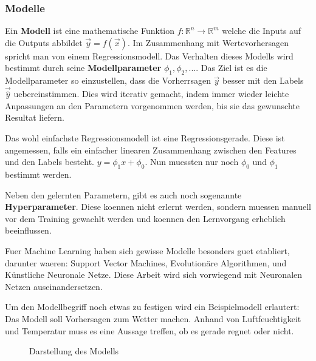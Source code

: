 \documentclass[../main]{subfiles}
\begin{document}
\subsubsection{Modelle}
Ein \textbf{Modell} ist eine mathematische Funktion $\mathit{f}\colon \mathbb{R}^n \to \mathbb{R}^m$ welche die Inputs auf die Outputs abbildet $\vec{y}=\mathit{f}(\vec{x})$.
Im Zusammenhang mit Wertevorhersagen spricht man von einem Regressionsmodell.
Das Verhalten dieses Modells wird bestimmt durch seine \textbf{Modellparameter} $\phi_1, \phi_2, ...$.
Das Ziel ist es die Modellparameter so einzustellen, dass die Vorherrsagen $\vec{y}$ besser mit den Labels $\vec{\hat{y}}$ uebereinstimmen.
Dies wird iterativ gemacht, indem immer wieder leichte Anpassungen an den Parametern vorgenommen werden, bis sie das gewunschte Resultat liefern. 
\par\medskip
Das wohl einfachste Regressionsmodell ist eine Regressionsgerade. Diese ist angemessen, falls ein einfacher linearen Zusammenhang zwischen den Features und den Labels besteht.
$y=\phi_1x + \phi_0$. Nun muessten nur noch $\phi_0$ und $\phi_1$ bestimmt werden. 

Neben den gelernten Parametern, gibt es auch noch sogenannte \textbf{Hyperparameter}.
Diese koennen nicht erlernt werden, sondern muessen manuell vor dem Training gewaehlt werden und koennen den Lernvorgang erheblich beeinflussen.
\par\medskip
Fuer Machine Learning haben sich gewisse Modelle besonders guet etabliert,
darunter waeren: Support Vector Machines, Evolutionäre Algorithmen, und Künstliche Neuronale Netze.
Diese Arbeit wird sich vorwiegend mit Neuronalen Netzen auseinandersetzen.
\par\medskip
Um den Modellbegriff noch etwas zu festigen wird ein Beispielmodell erlautert:\\
Das Modell soll Vorhersagen zum Wetter machen. Anhand von Luftfeuchtigkeit und
Temperatur muss es eine Aussage treffen, ob es gerade regnet oder nicht.

\begin{figure}[h!]
  \centering


  \caption{Darstellung des Modells}
\end{figure}
\end{document}

